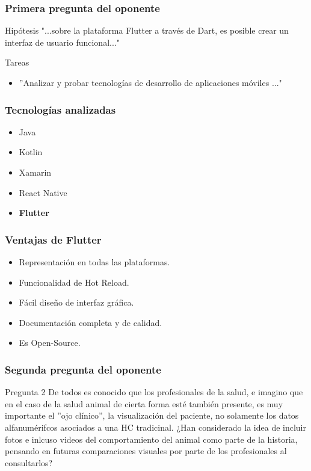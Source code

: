 \documentclass[14pt]{beamer}
\begin{document}
\begin{frame}
\frametitle{Primera pregunta del oponente}
\begin{block}{Hipótesis}
"...sobre la plataforma Flutter a través de Dart, es posible crear un interfaz de usuario funcional..."
\end{block}

\begin{alertblock}{Tareas}
\begin{itemize}
\item ''Analizar y probar tecnologías de desarrollo de aplicaciones móviles ..."
\end{itemize}

\end{alertblock}
\end{frame}

\begin{frame}
\frametitle{Tecnologías analizadas}
\begin{itemize}
\item Java
\item Kotlin
\item Xamarin
\item React Native
\item \textbf{Flutter}

\end{itemize}

\end{frame}






\begin{frame}
\frametitle{Ventajas de Flutter}

\begin{itemize}
\item Representación en todas las plataformas.
\item Funcionalidad de Hot Reload.
\item Fácil diseño de interfaz gráfica.
\item Documentación completa y de calidad.
\item Es Open-Source.
\end{itemize}

\end{frame}










\begin{frame}
\frametitle{Segunda pregunta del oponente}
\begin{block}{Pregunta 2}
De todos es conocido que los profesionales de la salud, e imagino que en el caso de la salud animal de cierta forma esté también presente, es muy importante el ''ojo clínico'', la visualización del paciente, no solamente los datos alfanumérifcos asociados a una HC tradicinal. ¿Han considerado la idea de incluir fotos e inlcuso videos del comportamiento del animal como parte de la historia, pensando en futuras comparaciones visuales por parte de los profesionales al consultarlos?
\end{block}
\end{frame}
\end{document}

